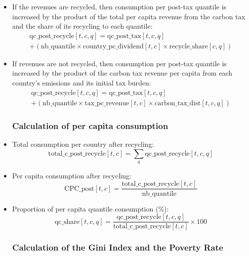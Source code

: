 \documentclass[
]{article}
\begin{document}
\begin{itemize}
\item
  If the revenues are recycled, then consumption per post-tax quantile
  is increased by the product of the total per capita revenue from the
  carbon tax and the share of its recycling to each quantile:
  \begin{multline}
    \text{qc\_post\_recycle}[t,c,q] = \text{qc\_post\_tax}[t,c,q] \\
+ (\text{nb\_quantile} \times \text{country\_pc\_dividend}[t,c] \times \text{recycle\_share}[c,q])
  \end{multline}

\item
  If revenues are not recycled, then consumption per post-tax quantile
  is increased by the product of the carbon tax revenue per capita from
  each country's emissions and its initial tax burden:
  \begin{multline}
    \text{qc\_post\_recycle}[t,c,q] = \text{qc\_post\_tax}[t,c,q] \\
 + (\text{nb\_quantile} \times \text{tax\_pc\_revenue}[t,c] \times \text{carbon\_tax\_dist}[t,c,q]) 
  \end{multline}

  \subsubsection{Calculation of per capita consumption}\label{calculation-per-capita-consumption}

\item
Total consumption per country after recycling:
  \begin{equation}
    \text{total\_c\_post\_recycle}[t,c] = \sum_q \text{qc\_post\_recycle}[t,c,q]
\end{equation}

\item
  Per capita consumption after recycling:
  \begin{equation}
    \text{CPC\_post}[t,c] = \frac{\text{total\_c\_post\_recycle}[t,c]}{\text{nb\_quantile}} 
\end{equation}

\item
  Proportion of per capita quantile consumption (\%):
  \begin{equation}
 \text{qc\_share}[t,c,q] = \frac{\text{qc\_post\_recycle}[t,c,q]}{\text{total\_c\_post\_recycle}[t,c]} \times 100
\end{equation}



\subsubsection{Calculation of the Gini Index and the Poverty Rate}\label{calculation-of-the-gini-index-and-the-poverty-rate}
\end{itemize}
\end{document}
